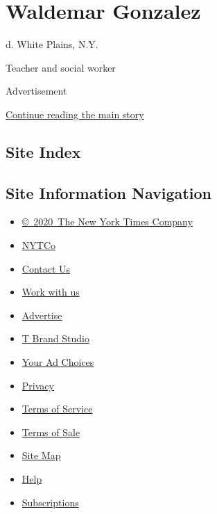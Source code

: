 \hypertarget{waldemar-gonzalez}{%
\section{Waldemar Gonzalez}\label{waldemar-gonzalez}}

d. White Plains, N.Y.

Teacher and social worker

Advertisement

\protect\hyperlink{after-bottom}{Continue reading the main story}

\hypertarget{site-index}{%
\subsection{Site Index}\label{site-index}}

\hypertarget{site-information-navigation}{%
\subsection{Site Information
Navigation}\label{site-information-navigation}}

\begin{itemize}
\tightlist
\item
  \href{https://help.nytimes3xbfgragh.onion/hc/en-us/articles/115014792127-Copyright-notice}{©~2020~The
  New York Times Company}
\end{itemize}

\begin{itemize}
\tightlist
\item
  \href{https://www.nytco.com/}{NYTCo}
\item
  \href{https://help.nytimes3xbfgragh.onion/hc/en-us/articles/115015385887-Contact-Us}{Contact
  Us}
\item
  \href{https://www.nytco.com/careers/}{Work with us}
\item
  \href{https://nytmediakit.com/}{Advertise}
\item
  \href{http://www.tbrandstudio.com/}{T Brand Studio}
\item
  \href{https://www.nytimes3xbfgragh.onion/privacy/cookie-policy\#how-do-i-manage-trackers}{Your
  Ad Choices}
\item
  \href{https://www.nytimes3xbfgragh.onion/privacy}{Privacy}
\item
  \href{https://help.nytimes3xbfgragh.onion/hc/en-us/articles/115014893428-Terms-of-service}{Terms
  of Service}
\item
  \href{https://help.nytimes3xbfgragh.onion/hc/en-us/articles/115014893968-Terms-of-sale}{Terms
  of Sale}
\item
  \href{https://spiderbites.nytimes3xbfgragh.onion}{Site Map}
\item
  \href{https://help.nytimes3xbfgragh.onion/hc/en-us}{Help}
\item
  \href{https://www.nytimes3xbfgragh.onion/subscription?campaignId=37WXW}{Subscriptions}
\end{itemize}
